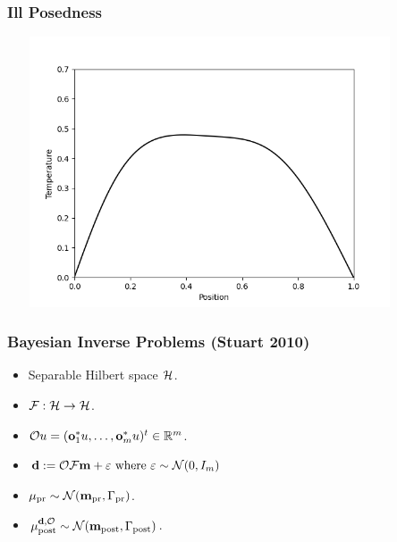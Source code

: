 \documentclass{beamer}
\begin{document}
\begin{frame}
  \frametitle{Ill Posedness}
    \href{run:reverse_heat_equation.mp4}{\includegraphics[width=12cm,height=8cm]{reverse_heat_equation.png}}    
\end{frame}


\begin{frame}
\frametitle{Bayesian Inverse Problems (Stuart 2010)}
\begin{itemize}
\item Separable Hilbert space $\mathcal{H}$.
\item \(\mathcal{F}: \mathcal{H} \to \mathcal{H}\). 
\item \(\mathcal{O} u = (\mathbf{o}_1^*u, \dots, \mathbf{o}_m^*u )^t \in \mathbb{R}^m\).
\item \(\mathbf{d} := \mathcal{O} \mathcal{F} \mathbf{m} + \varepsilon \text{ where } \varepsilon \sim \mathcal{N}(0,I_m)\)
\item \(\mu_{\textup{pr}} \sim \mathcal{N}(\mathbf{m}_{\textup{pr}}, \Gamma_{\textup{pr}})\).
\item \(\mu_{\textup{post}}^{\mathbf{d}, \mathcal{O}} \sim \mathcal{N}(\mathbf{m}_{\textup{post}}, \Gamma_{\textup{post}})\).
\end{itemize}

\end{frame}
\end{document}
